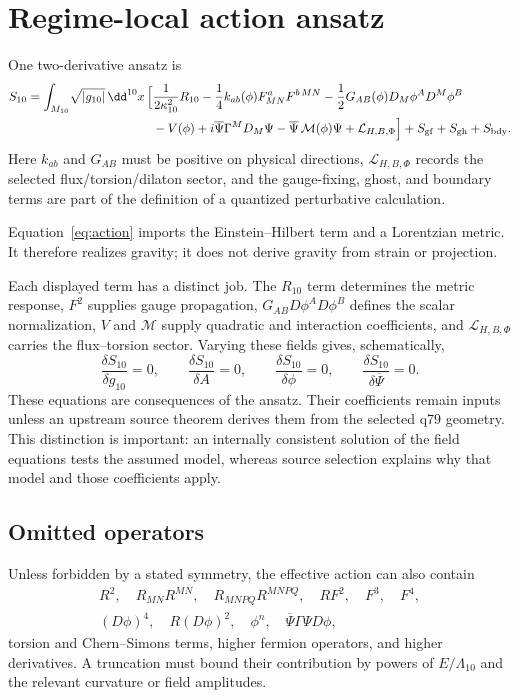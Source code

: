 \documentclass[11pt]{article}
\begin{document}
\section{Regime-local action ansatz}

One two-derivative ansatz is
\begin{align}
S_{10}=\int_{M_{10}}\!\sqrt{|g_{10}|}\,\dd^{10}x\,
\Big[&\frac{1}{2\kappa_{10}^2}R_{10}
-\frac14 k_{ab}(\phi)F^a_{MN}F^{b\,MN}
-\frac12G_{AB}(\phi)D_M\phi^A D^M\phi^B\nonumber\\
&-V(\phi)
+i\overline\Psi\Gamma^M D_M\Psi
-\overline\Psi\,\mathcal M(\phi)\Psi
+\mathcal L_{H,B,\Phi}
\Big]
+S_{\rm gf}+S_{\rm gh}+S_{\rm bdy}.
\label{eq:action}
\end{align}
Here $k_{ab}$ and $G_{AB}$ must be positive on physical directions,
$\mathcal L_{H,B,\Phi}$ records the selected flux/torsion/dilaton sector, and
the gauge-fixing, ghost, and boundary terms are part of the definition of a
quantized perturbative calculation.

Equation~\eqref{eq:action} imports the Einstein--Hilbert term and a Lorentzian
metric.  It therefore realizes gravity; it does not derive gravity from strain
or projection.

Each displayed term has a distinct job.  The $R_{10}$ term determines the
metric response, $F^2$ supplies gauge propagation, $G_{AB}D\phi^A D\phi^B$
defines the scalar normalization, $V$ and $\mathcal M$ supply quadratic and
interaction coefficients, and $\mathcal L_{H,B,\Phi}$ carries the
flux--torsion sector.  Varying these fields gives, schematically,
\[
\frac{\delta S_{10}}{\delta g_{10}}=0,\qquad
\frac{\delta S_{10}}{\delta A}=0,\qquad
\frac{\delta S_{10}}{\delta\phi}=0,\qquad
\frac{\delta S_{10}}{\delta\overline\Psi}=0.
\]
These equations are consequences of the ansatz.  Their coefficients remain
inputs unless an upstream source theorem derives them from the selected q79
geometry.  This distinction is important: an internally consistent solution
of the field equations tests the assumed model, whereas source selection
explains why that model and those coefficients apply.

\subsection{Omitted operators}

Unless forbidden by a stated symmetry, the effective action can also contain
\[
\begin{gathered}
 R^2,\quad R_{MN}R^{MN},\quad R_{MNPQ}R^{MNPQ},\quad
 RF^2,\quad F^3,\quad F^4,\\
 (D\phi)^4,\quad R(D\phi)^2,\quad \phi^n,\quad
 \overline\Psi\Gamma\Psi D\phi ,
\end{gathered}
\]
torsion and Chern--Simons terms, higher fermion operators, and higher
derivatives.  A truncation must bound their contribution by powers of
$E/\Lambda_{10}$ and the relevant curvature or field amplitudes.
\end{document}

